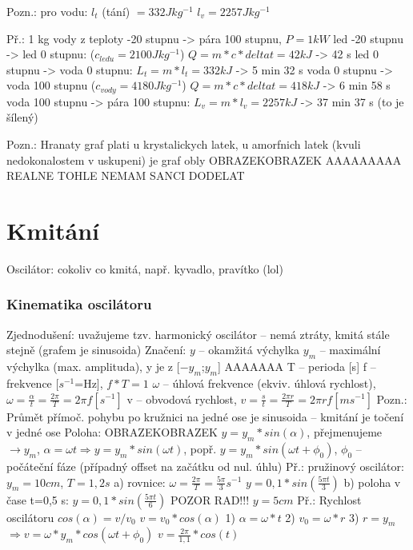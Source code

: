 \documentclass{article}
\begin{document}
Pozn.: pro vodu: $l_t$ (tání) $= 332 Jkg^{-1}$
$l_v = 2257 Jkg^{-1}$

Př.: 1 kg vody z teploty -20 stupnu -> pára 100 stupnu, $P = 1 kW$
led -20 stupnu -> led 0 stupnu: ($c_{ledu} = 2100 Jkg^{-1}$) $Q = m*c*deltat = 42 kJ$ -> 42 s
led 0 stupnu -> voda 0 stupnu: $L_t = m*l_t = 332 kJ$ -> 5 min 32 s
voda 0 stupnu -> voda 100 stupnu ($c_{vody} = 4180 Jkg^{-1}$) $Q = m*c*deltat = 418 kJ$ -> 6 min 58 s
voda 100 stupnu -> pára 100 stupnu: $L_v = m*l_v = 2257 kJ$ -> 37 min 37 s (to je šílený)

Pozn.: Hranaty graf plati u krystalickych latek, u amorfnich latek (kvuli nedokonalostem v uskupeni) je graf obly OBRAZEKOBRAZEK
AAAAAAAAA REALNE TOHLE NEMAM SANCI DODELAT

\part{Kmitání}
Oscilátor: cokoliv co kmitá, např. kyvadlo, pravítko (lol)

\section{Kinematika oscilátoru}
Zjednodušení: uvažujeme tzv. harmonický oscilátor -- nemá ztráty, kmitá stále stejně (grafem je sinusoida)
Značení: $y$ -- okamžitá výchylka
         $y_m$ -- maximální výchylka (max. amplituda), y je z [$-y_m$;$y_m$] AAAAAAA
         T -- perioda [s]
         f -- frekvence [$s^{-1}$=Hz], $f*T=1$
        $\omega$ -- úhlová frekvence (ekviv. úhlová rychlost), $\omega=\frac{\alpha}{t}=\frac{2\pi}{T}=2\pi f [s^{-1}]$
        v -- obvodová rychlost, $v=\frac{s}{t}=\frac{2\pi r}{T}=2\pi rf [ms^{-1}]$
Pozn.: Průmět přímoč. pohybu po kružnici na jedné ose je sinusoida -- kmitání je točení v jedné ose
Poloha: OBRAZEKOBRAZEK $y=y_m*sin(\alpha)$, přejmenujeme $\rightarrow y_m$, $\alpha = \omega t \Rightarrow y=y_m*sin(\omega t)$, popř. $y=y_m*sin(\omega t+{\phi}_0)$, ${\phi}_0$ -- počáteční fáze (případný offset na začátku od nul. úhlu)
Př.: pružinový oscilátor: $y_m=10cm$, $T=1,2s$
        a) rovnice: $\omega = \frac{2\pi}{T}=\frac{5\pi}{3}s^{-1}$
                    $y=0,1*sin(\frac{5\pi t}{3})$
        b) poloha v čase t=0,5 s: $y=0,1*sin(\frac{5\pi t}{6})$ POZOR RAD!!!
                                  $y=5cm$
Př.: Rychlost oscilátoru
     $cos (\alpha) = v/v_0$
     $v=v_0*cos (\alpha)$
        1) $\alpha = \omega * t$
        2) $v_0 = \omega * r$
        3) $r = y_m$
     $\Rightarrow v = \omega * y_m * cos(\omega t + {\phi}_0)$
     $v = \frac{2 \pi}{1,1}*cos(t)$
\end{document}
